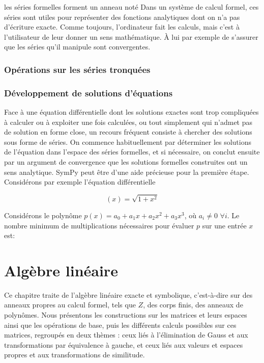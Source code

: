les séries formelles forment un anneau noté Dans un système de calcul formel, ces séries sont utiles pour représenter des fonctions analytiques dont on n'a pas d’écriture exacte. Comme toujours, l’ordinateur fait les calculs, mais c’est à l'utilisateur de leur donner un sens mathématique. À lui par exemple de s’assurer que les séries qu’il manipule sont convergentes. 
 \subsection{Opérations sur les séries tronquées}
 \subsection{Développement de solutions d’équations}
 Face à une équation différentielle dont les solutions exactes sont trop compliquées à calculer ou à exploiter une fois calculées, ou tout simplement qui n’admet pas de solution en forme close, un recours fréquent consiste à chercher des solutions sous forme de séries. On commence habituellement par déterminer les solutions 
de l’équation dans l’espace des séries formelles, et si nécessaire, on conclut ensuite par un argument de convergence que les solutions formelles construites ont un sens analytique. SymPy peut être d’une aide précieuse pour la première étape. Considérons par exemple l’équation différentielle

\begin{example}
\[
 \left(x\right) = \sqrt{1+x^{2}}
\]
\end{example}



\begin{exercise}
Considérons le polynôme $p(x) = a_{0} + a_{1} x + a_{2} x^{2} + a_{3} x^{3}$, où $a_{i} \neq 0$ $\forall i$. Le nombre minimum de multiplications nécessaires pour évaluer $p$ sur une entrée $x$ est:
\end{exercise}
\chapter{Algèbre linéaire}
Ce chapitre traite de l’algèbre linéaire exacte et symbolique, c’est-à-dire sur
des anneaux propres au calcul formel, tels que $Z$, des corps finis, des anneaux de
polynômes. Nous présentons les constructions sur les matrices et leurs espaces ainsi que les
opérations de base, puis les différents calculs possibles sur ces matrices, regroupés en deux thèmes : ceux liés à l’élimination de Gauss et aux transformations par équivalence à gauche, et ceux liés aux valeurs et espaces
propres et aux transformations de similitude.
